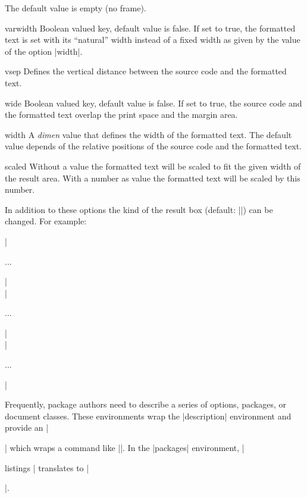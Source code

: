 \documentclass{ltxguidex}
\begin{document}
\begin{options}
	The default value is empty (no frame).
	\item[varwidth] Boolean valued key, default value is false. If set to
	true, the formatted text is set with its ``natural'' width instead of a
	fixed width as given by the value of the option |width|.
	\item[vsep] Defines the vertical distance between the source code and the
	formatted text.
	\item[wide] Boolean valued key, default value is false. If set to
	true, the source code and the formatted text overlap the print space
	and the margin area.
	\item[width] A \textit{dimen} value that defines the width of the
	formatted text. The default value depends of the relative positions of
	the source code and the formatted text.
	\item[scaled] Without a value the formatted text will be scaled to fit
	the given width of the result area. With a number as value the formatted
	text will be scaled by this number.
\end{options}

In addition to these options the kind of the result box (default: |\fbox|)
can be changed. For example:
\begin{latexcode}
\renewcommand\ResultBox{\fcolorbox{green}{lightgray}}
\setlength\ResultBoxSep{5mm}%
\setlength\ResultBoxRule{2mm}%
\end{latexcode}

\begin{desc}
|\begin{packages}...\end{packages}|\\
|\begin{classes}...\end{classes}|\\
|\begin{options}...\end{options}|\\
\end{desc}

Frequently, package authors need to describe a series of options, packages,
or document classes. These environments wrap the |description| environment
and provide an |\item| which wraps a command like |\package|. In the
|packages| environment, |\item[listings]| translates to
|\item[\package{listings}]|.
\end{document}
